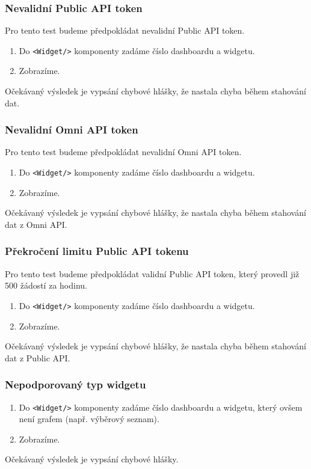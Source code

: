 \documentclass[czech, bc, kiv, he, iso690numb]{fasthesis}
\begin{document}
\subsubsection{Nevalidní Public API token}
Pro tento test budeme předpokládat nevalidní Public API token.
\begin{enumerate}
	\item Do \texttt{<Widget/>} komponenty zadáme číslo dashboardu a widgetu.
	\item Zobrazíme.
\end{enumerate}
Očekávaný výsledek je vypsání chybové hlášky, že nastala chyba během stahování dat.

\subsubsection{Nevalidní Omni API token}
Pro tento test budeme předpokládat nevalidní Omni API token.
\begin{enumerate}
	\item Do \texttt{<Widget/>} komponenty zadáme číslo dashboardu a widgetu.
	\item Zobrazíme.
\end{enumerate}
Očekávaný výsledek je vypsání chybové hlášky, že nastala chyba během stahování dat z Omni API.

\subsubsection{Překročení limitu Public API tokenu}
Pro tento test budeme předpokládat validní Public API token, který provedl již 500 žádostí za hodinu.
\begin{enumerate}
	\item Do \texttt{<Widget/>} komponenty zadáme číslo dashboardu a widgetu.
	\item Zobrazíme.
\end{enumerate}
Očekávaný výsledek je vypsání chybové hlášky, že nastala chyba během stahování dat z Public API.

\subsubsection{Nepodporovaný typ widgetu}
\begin{enumerate}
	\item Do \texttt{<Widget/>} komponenty zadáme číslo dashboardu a widgetu, který ovšem není grafem (např. výběrový seznam).
	\item Zobrazíme.
\end{enumerate}
Očekávaný výsledek je vypsání chybové hlášky.
\end{document}
